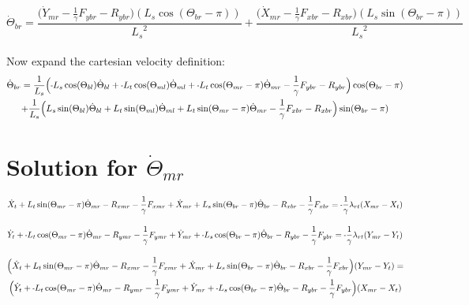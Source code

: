 \documentclass[11pt, landscape]{article}
\newcommand{\mn}{\scalebox{0.7}[1.0]{-}}
\begin{document}
\begin{equation}
\dot{\Theta}_{br} =
\frac{\Big(\dot{Y}_{mr} - \frac{1}{\gamma}F_{ybr} - R_{ybr} \Big)(L_{s}\cos(\Theta_{br}-\pi))}
{{L_{s}}^2}
+ \frac{\Big(\dot{X}_{mr} - \frac{1}{\gamma}F_{xbr} - R_{xbr} \Big)(L_{s}\sin(\Theta_{br}-\pi))}
{{L_{s}}^2}
\end{equation}
\\
Now expand the cartesian velocity definition: \\

\begin{multline}
\dot{\Theta}_{br} =
\frac{1}{L_{s}}\Big(\mn L_{s}\cos(\Theta_{bl})\dot{\Theta}_{bl} + \mn L_{t}\cos(\Theta_{ml})\dot{\Theta}_{ml} + \mn L_{t}\cos(\Theta_{mr}-\pi)\dot{\Theta}_{mr} - \frac{1}{\gamma}F_{ybr} - R_{ybr} \Big)\cos(\Theta_{br}-\pi) \\
+ \frac{1}{L_{s}}\Big(L_{s}\sin(\Theta_{bl})\dot{\Theta}_{bl} + L_{t}\sin(\Theta_{ml})\dot{\Theta}_{ml} + L_{t}\sin(\Theta_{mr}-\pi)\dot{\Theta}_{mr} - \frac{1}{\gamma}F_{xbr} - R_{xbr} \Big)\sin(\Theta_{br}-\pi)
\end{multline}


\section{Solution for $\dot{\Theta}_{mr}$}

\begin{equation}
\dot{X}_{t } + L_{t}\sin(\Theta_{mr}-\pi)  \dot{\Theta}_{mr} - R_{xmr} - \frac{1}{\gamma}F_{xmr} + 
\dot{X}_{mr} + L_{s}\sin(\Theta_{br}-\pi)  \dot{\Theta}_{br} - R_{xbr} - \frac{1}{\gamma}F_{xbr} = \mn\frac{1}{\gamma}\lambda_{rt}(X_{mr} - X_{t })
\end{equation}

\begin{equation}
\dot{Y}_{t } + \mn L_{t}\cos(\Theta_{mr}-\pi)  \dot{\Theta}_{mr} - R_{ymr} - \frac{1}{\gamma}F_{ymr} +
\dot{Y}_{mr} + \mn L_{s}\cos(\Theta_{br}-\pi)  \dot{\Theta}_{br} - R_{ybr} - \frac{1}{\gamma}F_{ybr} = \mn\frac{1}{\gamma}\lambda_{rt}(Y_{mr} - Y_{t })
\end{equation}

\begin{multline}
\Big ( \dot{X}_{t } + L_{t}\sin(\Theta_{mr}-\pi)  \dot{\Theta}_{mr} - R_{xmr} - \frac{1}{\gamma}F_{xmr} 
+ \dot{X}_{mr} + L_{s}\sin(\Theta_{br}-\pi)  \dot{\Theta}_{br} - R_{xbr} - \frac{1}{\gamma}F_{xbr} \Big ) (Y_{mr} - Y_{t }) = \\
\Big ( \dot{Y}_{t } + \mn L_{t}\cos(\Theta_{mr}-\pi)  \dot{\Theta}_{mr} - R_{ymr} - \frac{1}{\gamma}F_{ymr}
+ \dot{Y}_{mr} + \mn L_{s}\cos(\Theta_{br}-\pi)  \dot{\Theta}_{br} - R_{ybr} - \frac{1}{\gamma}F_{ybr} \Big ) (X_{mr} - X_{t })
\end{multline}
\end{document}
